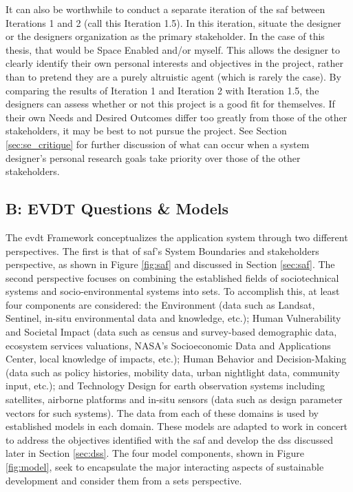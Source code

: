 It can also be worthwhile to conduct a separate iteration of the \ac{saf} between Iterations 1 and 2 (call this Iteration 1.5). In this iteration, situate the designer or the designers organization as the primary stakeholder. In the case of this thesis, that would be Space Enabled and/or myself. This allows the designer to clearly identify their own personal interests and objectives in the project, rather than to pretend they are a purely altruistic agent (which is rarely the case).
By comparing the results of Iteration 1 and Iteration 2 with Iteration 1.5, the designers can assess whether or not this project is a good fit for themselves. If their own Needs and Desired Outcomes differ too greatly from those of the other stakeholders, it may be best to not pursue the project. See Section \ref{sec:se_critique} for further discussion of what can occur when a system designer's personal research goals take priority over those of the other stakeholders.





\subsection{B: EVDT Questions \& Models} \label{sec:evdt-questions}

The \ac{evdt} Framework conceptualizes the application system through two different perspectives. The first is that of \ac{saf}'s System Boundaries and stakeholders perspective, as shown in Figure \ref{fig:saf} and discussed in Section \ref{sec:saf}. The second perspective focuses on combining the established fields of sociotechnical systems \cite{rouseUnderstandingChangeComplex2012,siddiqiSociotechnicalSystemsSustainability2017,sussmanTeachingComplexSociotechnical2010} and socio-environmental systems \cite{elsawahEightGrandChallenges2020} into \acf{sets}. To accomplish this, at least four components are considered: the Environment (data such as Landsat, Sentinel, in-situ environmental data and knowledge, etc.); Human Vulnerability and Societal Impact (data such as census and survey-based demographic data, ecosystem services valuations, NASA's Socioeconomic Data and Applications Center, local knowledge of impacts, etc.); Human Behavior and Decision-Making (data such as policy histories, mobility data, urban nightlight data, community input, etc.); and Technology Design for earth observation systems including satellites, airborne platforms and in-situ sensors (data such as design parameter vectors for such systems). The data from each of these domains is used by established models in each domain. These models are adapted to work in concert to address the objectives identified with the \ac{saf} and develop the \ac{dss} discussed later in Section \ref{sec:dss}. The four model components, shown in Figure \ref{fig:model}, seek to encapsulate the major interacting aspects of sustainable development and consider them from a \ac{sets} perspective. 

